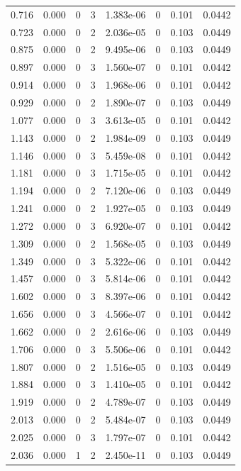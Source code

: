 \documentclass[preview]{standalone}
\begin{document}
{{\begin{tabular}{L{1.2cm}C{1.2cm} C{0.3cm}C{0.5cm} C{1.4cm}C{1.4cm} C{1.4cm}C{1.4cm}}
  0.716  &  0.000  & 0     &  3 &  1.383e-06  & 0  & 0.101 &  0.0442   \\ 
  0.723  &  0.000  & 0     &  2 &  2.036e-05  & 0  & 0.103 &  0.0449   \\ 
  0.875  &  0.000  & 0     &  2 &  9.495e-06  & 0  & 0.103 &  0.0449   \\ 
  0.897  &  0.000  & 0     &  3 &  1.560e-07  & 0  & 0.101 &  0.0442   \\ 
  0.914  &  0.000  & 0     &  3 &  1.968e-06  & 0  & 0.101 &  0.0442   \\ 
  0.929  &  0.000  & 0     &  2 &  1.890e-07  & 0  & 0.103 &  0.0449   \\ 
  1.077  &  0.000  & 0     &  3 &  3.613e-05  & 0  & 0.101 &  0.0442   \\ 
  1.143  &  0.000  & 0     &  2 &  1.984e-09  & 0  & 0.103 &  0.0449   \\ 
  1.146  &  0.000  & 0     &  3 &  5.459e-08  & 0  & 0.101 &  0.0442   \\ 
  1.181  &  0.000  & 0     &  3 &  1.715e-05  & 0  & 0.101 &  0.0442   \\ 
  1.194  &  0.000  & 0     &  2 &  7.120e-06  & 0  & 0.103 &  0.0449   \\ 
  1.241  &  0.000  & 0     &  2 &  1.927e-05  & 0  & 0.103 &  0.0449   \\ 
  1.272  &  0.000  & 0     &  3 &  6.920e-07  & 0  & 0.101 &  0.0442   \\ 
  1.309  &  0.000  & 0     &  2 &  1.568e-05  & 0  & 0.103 &  0.0449   \\ 
  1.349  &  0.000  & 0     &  3 &  5.322e-06  & 0  & 0.101 &  0.0442   \\ 
  1.457  &  0.000  & 0     &  3 &  5.814e-06  & 0  & 0.101 &  0.0442   \\ 
  1.602  &  0.000  & 0     &  3 &  8.397e-06  & 0  & 0.101 &  0.0442   \\ 
  1.656  &  0.000  & 0     &  3 &  4.566e-07  & 0  & 0.101 &  0.0442   \\ 
  1.662  &  0.000  & 0     &  2 &  2.616e-06  & 0  & 0.103 &  0.0449   \\ 
  1.706  &  0.000  & 0     &  3 &  5.506e-06  & 0  & 0.101 &  0.0442   \\ 
  1.807  &  0.000  & 0     &  2 &  1.516e-05  & 0  & 0.103 &  0.0449   \\ 
  1.884  &  0.000  & 0     &  3 &  1.410e-05  & 0  & 0.101 &  0.0442   \\ 
  1.919  &  0.000  & 0     &  2 &  4.789e-07  & 0  & 0.103 &  0.0449   \\ 
  2.013  &  0.000  & 0     &  2 &  5.484e-07  & 0  & 0.103 &  0.0449   \\ 
  2.025  &  0.000  & 0     &  3 &  1.797e-07  & 0  & 0.101 &  0.0442   \\ 
  2.036  &  0.000  & 1     &  2 &  2.450e-11  & 0  & 0.103 &  0.0449   \\ 
\hline 
\end{tabular} 

}}
\end{document}
